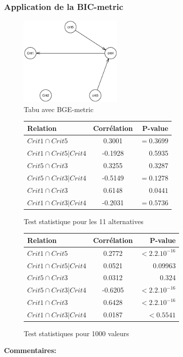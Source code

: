 \documentclass[a4paper]{article}
\begin{document}
\begin{appendices}
\subsubsection{Application de la BIC-metric}
\begin{figure}[H] 
    \center 
    \includegraphics[width=5cm]{IM_GRAPHE_GUIT.eps} 
    \caption{Tabu avec BGE-metric } 
\end{figure} 
\begin{figure}[H]
\begin{center}
\begin{tabular}{|l|c|r|}
  \hline
  Relation & Corrélation & P-value \\
  \hline
$Crit1 \cap Crit5$&0.3001&$=0.3699 $\\
$Crit1 \cap Crit5 | Crit4$&-0.1928&0.5935 \\
$Crit5 \cap Crit3$&0.3255&0.3287 \\
$Crit5 \cap Crit3 |Crit4$&-0.5149&$=0.1278$\\
$Crit1 \cap Crit3$&0.6148&$0.0441$\\
$Crit1 \cap Crit3 |Crit4$&  -0.2031&$=0.5736$\\
\hline
\end{tabular}
\end{center}
\caption{Test statistique pour les 11 alternatives }
\end{figure}





\begin{figure}[H]
\begin{center}
\begin{tabular}{|l|c|r|}
  \hline
  Relation & Corrélation & P-value \\
  \hline
$Crit1 \cap Crit5$&0.2772&$<2.2.10^{-16} $\\
$Crit1 \cap Crit5 | Crit4$&0.0521&0.09963 \\
$Crit5 \cap Crit3$&0.0312&0.324 \\
$Crit5 \cap Crit3 |Crit4$&-0.6205&$<2.2.10^{-16}$\\
$Crit1 \cap Crit3$&0.6428&$<2.2.10^{-16} $\\
$Crit1 \cap Crit3 |Crit4$&  0.0187&$<0.5541$\\
\hline
\end{tabular}
\end{center}
\caption{Test statistiques pour 1000 valeurs }
\end{figure}
\textbf{Commentaires:}


\end{appendices}
\end{document}
